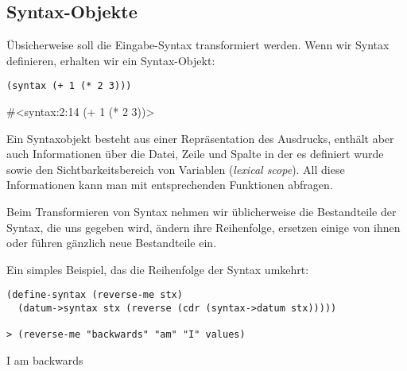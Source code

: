 \subsection{Syntax-Objekte}
Übsicherweise soll die Eingabe-Syntax transformiert werden. Wenn wir Syntax definieren, erhalten wir ein Syntax-Objekt:

\begin{lstlisting}
(syntax (+ 1 (* 2 3)))
\end{lstlisting}
{\routput\#<syntax:2:14 (+ 1 (* 2 3))>}

Ein Syntaxobjekt besteht aus einer Repräsentation des Ausdrucks, enthält aber auch Informationen über die Datei, Zeile und Spalte in der es definiert wurde sowie den Sichtbarkeitsbereich von Variablen (\emph{lexical scope}). All diese Informationen kann man mit entsprechenden Funktionen abfragen.%
% 
% 
% 
% 
% 
% 

Beim Transformieren von Syntax nehmen wir üblicherweise die Bestandteile der Syntax, die uns gegeben wird, ändern ihre Reihenfolge, ersetzen einige von ihnen oder führen gänzlich neue Bestandteile ein.

Ein simples Beispiel, das die Reihenfolge der Syntax umkehrt:

\begin{lstlisting}
(define-syntax (reverse-me stx)
  (datum->syntax stx (reverse (cdr (syntax->datum stx)))))
  
> (reverse-me "backwards" "am" "I" values)
\end{lstlisting}
{\routput {\qq}I{\qq} {\qq}am{\qq} {\qq}backwards{\qq}}

